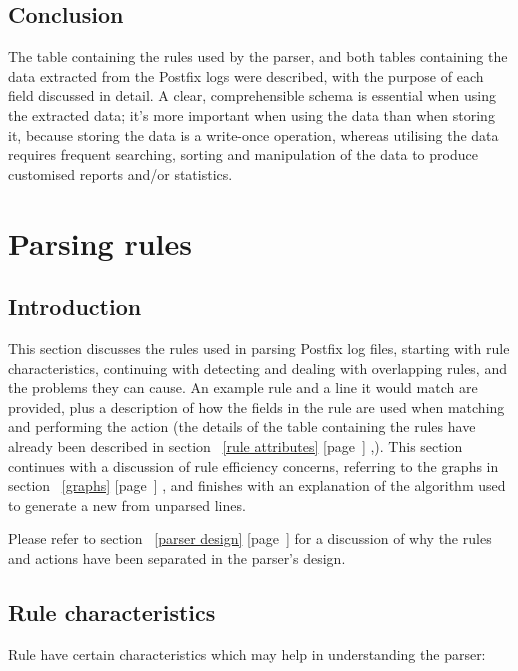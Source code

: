 \documentclass[a4paper,12pt,draft]{article}
\newcommand{\refwithpage}[1]{%
    \empty{}\ref{#1} [page~\pageref{#1}]%
}
\begin{document}
\subsection{Conclusion}

The table containing the rules used by the parser, and both tables
containing the data extracted from the Postfix logs were described, with
the purpose of each field discussed in detail.  A clear, comprehensible
schema is essential when using the extracted data; it's more important when
using the data than when storing it, because storing the data is a
write-once operation, whereas utilising the data requires frequent
searching, sorting and manipulation of the data to produce customised
reports and/or statistics.

\section{Parsing rules}

\label{rules}

\subsection{Introduction}

This section discusses the rules used in parsing Postfix log files,
starting with rule characteristics, continuing with detecting and dealing
with overlapping rules, and the problems they can cause.  An example rule
and a line it would match are provided, plus a description of how the
fields in the rule are used when matching and performing the action (the
details of the table containing the rules have already been described in
section~\refwithpage{rule attributes},).  This section continues with a
discussion of rule efficiency concerns, referring to the graphs in
section~\refwithpage{graphs}, and finishes with an explanation of the
algorithm used to generate a new \regex{} from unparsed lines.

Please refer to section~\refwithpage{parser design} for a discussion of why
the rules and actions have been separated in the parser's design.

\subsection{Rule characteristics}

\label{rule characteristics}


Rule have certain characteristics which may help in understanding the
parser:
\end{document}
